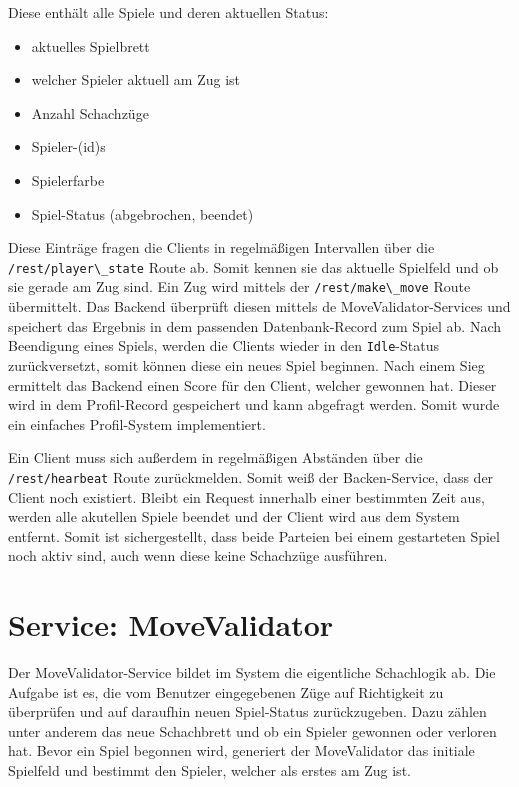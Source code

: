 Diese enthält alle Spiele und deren aktuellen Status:

\begin{itemize}
\tightlist
\item
  aktuelles Spielbrett
\item
  welcher Spieler aktuell am Zug ist
\item
  Anzahl Schachzüge
\item
  Spieler-(id)s
\item
  Spielerfarbe
\item
  Spiel-Status (abgebrochen, beendet)
\end{itemize}

Diese Einträge fragen die Clients in regelmäßigen Intervallen über die
\passthrough{\lstinline!/rest/player\_state!} Route ab. Somit kennen sie
das aktuelle Spielfeld und ob sie gerade am Zug sind. Ein Zug wird
mittels der \passthrough{\lstinline!/rest/make\_move!} Route
übermittelt. Das Backend überprüft diesen mittels de
MoveValidator-Services und speichert das Ergebnis in dem passenden
Datenbank-Record zum Spiel ab. Nach Beendigung eines Spiels, werden die
Clients wieder in den \passthrough{\lstinline!Idle!}-Status
zurückversetzt, somit können diese ein neues Spiel beginnen. Nach einem
Sieg ermittelt das Backend einen Score für den Client, welcher gewonnen
hat. Dieser wird in dem Profil-Record gespeichert und kann abgefragt
werden. Somit wurde ein einfaches Profil-System implementiert.

Ein Client muss sich außerdem in regelmäßigen Abständen über die
\passthrough{\lstinline!/rest/hearbeat!} Route zurückmelden. Somit weiß
der Backen-Service, dass der Client noch existiert. Bleibt ein Request
innerhalb einer bestimmten Zeit aus, werden alle akutellen Spiele
beendet und der Client wird aus dem System entfernt. Somit ist
sichergestellt, dass beide Parteien bei einem gestarteten Spiel noch
aktiv sind, auch wenn diese keine Schachzüge ausführen.

\hypertarget{service-movevalidator}{%
\section{Service: MoveValidator}\label{service-movevalidator}}

Der MoveValidator-Service bildet im System die eigentliche Schachlogik
ab. Die Aufgabe ist es, die vom Benutzer eingegebenen Züge auf
Richtigkeit zu überprüfen und auf daraufhin neuen Spiel-Status
zurückzugeben. Dazu zählen unter anderem das neue Schachbrett und ob ein
Spieler gewonnen oder verloren hat. Bevor ein Spiel begonnen wird,
generiert der MoveValidator das initiale Spielfeld und bestimmt den
Spieler, welcher als erstes am Zug ist.

